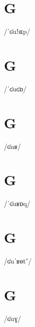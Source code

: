 \documentclass[10pt,a4paper,twoside]{book}
\begin{document}
\section*{G}

\begin{multicols}{3}
 {/ˈʛuǃɶp/} {}
\end{multicols}

\section*{G}

\begin{multicols}{3}
 {/ˈʛuʛɒ/} {}
\end{multicols}

\section*{G}

\begin{multicols}{3}
 {/ʛuʁ/} {}
\end{multicols}

\section*{G}

\begin{multicols}{3}
 {/ˈʛuʁɒq/} {}
\end{multicols}

\section*{G}

\begin{multicols}{3}
 {/ʛuˈʁɵtʼ/} {}
\end{multicols}

\section*{G}

\begin{multicols}{3}
 {/ʛuɣ/} {}
\end{multicols}
\end{document}
